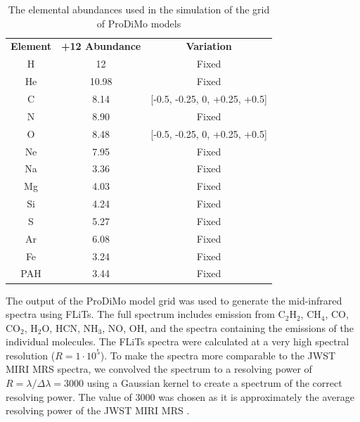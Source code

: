 \documentclass[twoside, single, authoryear, semicolon, 12pt]{lion-msc}
\newcommand{\4}{$_4$}
\newcommand{\3}{$_3$}
\newcommand{\2}{$_2$}
\begin{document}
\begin{table}[!ht]
\centering
\begin{tabular}{@{}ccc@{}}
                                  &                             &                            \\ \hline\midrule
\textbf{Element} & \textbf{+12 Abundance} & \textbf{Variation}            \\ \midrule
H                & 12                     & Fixed                         \\
He               & 10.98                 & Fixed                         \\
C                & 8.14                  & {[}-0.5, -0.25, 0, +0.25, +0.5{]} \\
N                & 8.90                  & Fixed                         \\
O                & 8.48                  & {[}-0.5, -0.25, 0, +0.25, +0.5{]} \\
Ne               & 7.95                  & Fixed                         \\
Na               & 3.36                  & Fixed                         \\
Mg               & 4.03                  & Fixed                         \\
Si               & 4.24                  & Fixed                         \\
S                & 5.27                  & Fixed                         \\
Ar               & 6.08                  & Fixed                         \\
Fe               & 3.24                  & Fixed                         \\
PAH              & 3.44                  & Fixed                         \\ \bottomrule
\end{tabular}
\caption{The elemental abundances used in the simulation of the grid of ProDiMo models}
\label{tab: abundances}
\end{table}



The output of the ProDiMo model grid was used to generate the mid-infrared spectra using FLiTs. The full spectrum includes emission from C\2H\2, CH\4, CO, CO\2, H\2O, HCN, NH\3, NO, OH, and the spectra containing the emissions of the individual molecules. The FLiTs spectra were calculated at a very high spectral resolution ($R=1\cdot10^5$). To make the spectra more comparable to the JWST MIRI MRS spectra, we convolved the spectrum to a resolving power of $R = \lambda/\Delta\lambda = 3000$ using a Gaussian kernel to create a spectrum of the correct resolving power. The value of 3000 was chosen as it is approximately the average resolving power of the JWST MIRI MRS \citep{Argyriou_2023}. 
\end{document}
